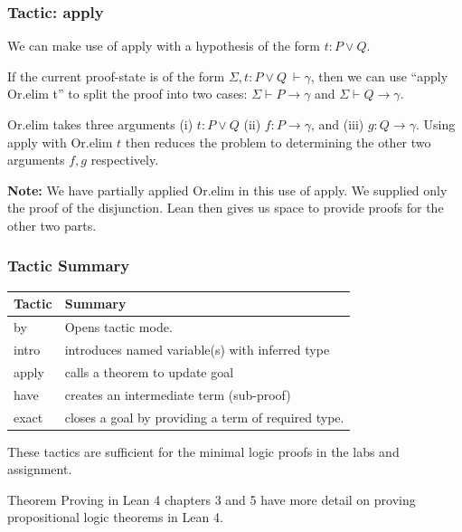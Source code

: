 \documentclass{beamer}
\theoremstyle{indentDefn} \newtheorem{defn}[]{Definition}
\begin{document}
\begin{frame}
	\frametitle{Tactic: apply}

	We can make use of apply with a hypothesis of the form $t : P \lor Q$. 
	
	If the current proof-state is of the form $\Sigma, t : P \lor Q \ \vdash \gamma$, then we can use ``apply Or.elim t'' to split the proof into two cases: $\Sigma \vdash P \to \gamma$ and $\Sigma \vdash Q \to \gamma$.
	
	Or.elim takes three arguments (i) $t : P \lor Q$ (ii) $f : P \to \gamma$, and (iii) $g: Q \to \gamma$. Using apply with Or.elim $t$ then reduces the problem to determining the other two arguments $f, g$ respectively. 
	
	{\bf Note:} We have partially applied Or.elim in this use of apply. We supplied only the proof of the disjunction. Lean then gives us space to provide proofs for the other two parts. 

\end{frame}

\begin{frame}
	\frametitle{Tactic Summary}
	
	\begin{table}
    		\begin{tabular}{l | l}
			Tactic & Summary \\
			\hline
			by & Opens tactic mode. \\
			intro & introduces named variable(s) with inferred type \\
			apply & calls a theorem to update goal \\
			have & creates an intermediate term (sub-proof) \\
			exact & closes a goal by providing a term of required type.			
		\end{tabular}
	\end{table}
	
	These tactics are sufficient for the minimal logic proofs in the labs and assignment.
	
	Theorem Proving in Lean 4 chapters 3 and 5 have more detail on proving propositional logic theorems in Lean 4.

\end{frame}

\end{document}
